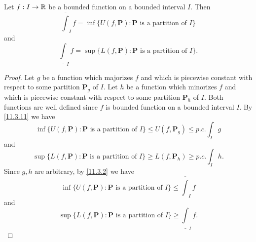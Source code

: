 \begin{prop}\label{11.3.12}
  Let \(f : I \to \mathbb{R}\) be a bounded function on a bounded interval \(I\).
  Then
  \[
    \overline{\int}_I f = \inf\{U(f, \mathbf{P}) : \mathbf{P} \text{ is a partition of } I\}
  \]
  and
  \[
    \underline{\int}_I f = \sup\{L(f, \mathbf{P}) : \mathbf{P} \text{ is a partition of } I\}.
  \]
\end{prop}

\begin{proof}
  Let \(g\) be a function which majorizes \(f\) and which is piecewise constant with respect to some partition \(\mathbf{P}_g\) of \(I\).
  Let \(h\) be a function which minorizes \(f\) and which is piecewise constant with respect to some partition \(\mathbf{P}_h\) of \(I\).
  Both functions are well defined since \(f\) is bounded function on a bounded interval \(I\).
  By \cref{11.3.11} we have
  \[
    \inf\big\{U(f, \mathbf{P}) : \mathbf{P} \text{ is a partition of } I\big\} \leq U(f, \mathbf{P}_g) \leq p.c. \int_I g
  \]
  and
  \[
    \sup\big\{L(f, \mathbf{P}) : \mathbf{P} \text{ is a partition of } I\big\} \geq L(f, \mathbf{P}_h) \geq p.c. \int_I h.
  \]
  Since \(g, h\) are arbitrary, by \cref{11.3.2} we have
  \[
    \inf\big\{U(f, \mathbf{P}) : \mathbf{P} \text{ is a partition of } I\big\} \leq \overline{\int}_I f
  \]
  and
  \[
    \sup\big\{L(f, \mathbf{P}) : \mathbf{P} \text{ is a partition of } I\big\} \geq \underline{\int}_I f.
  \]


\end{proof}
